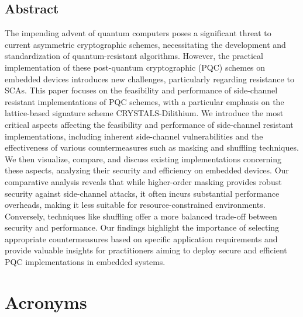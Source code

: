 \documentclass[a4paper,12pt,oneside,openany,headsepline,bibliography=totocnumbered]{scrbook}
\begin{document}


\section*{Abstract}
\thispagestyle{abstract}

The impending advent of quantum computers poses a significant threat to current asymmetric cryptographic schemes, necessitating the development and standardization of quantum-resistant algorithms. However, the practical implementation of these post-quantum cryptographic (PQC) schemes on embedded devices introduces new challenges, particularly regarding resistance to \acp{SCA}. This paper focuses on the feasibility and performance of side-channel resistant implementations of PQC schemes, with a particular emphasis on the lattice-based signature scheme CRYSTALS-Dilithium. We introduce the most critical aspects affecting the feasibility and performance of side-channel resistant implementations, including inherent side-channel vulnerabilities and the effectiveness of various countermeasures such as masking and shuffling techniques. We then visualize, compare, and discuss existing implementations concerning these aspects, analyzing their security and efficiency on embedded devices. Our comparative analysis reveals that while higher-order masking provides robust security against side-channel attacks, it often incurs substantial performance overheads, making it less suitable for resource-constrained environments. Conversely, techniques like shuffling offer a more balanced trade-off between security and performance. Our findings highlight the importance of selecting appropriate countermeasures based on specific application requirements and provide valuable insights for practitioners aiming to deploy secure and efficient PQC implementations in embedded systems.



\tableofcontents
\thispagestyle{contents}

\chapter*{Acronyms}
\thispagestyle{acronyms}
\begin{acronym}[PQC]
\end{acronym}
\end{document}
